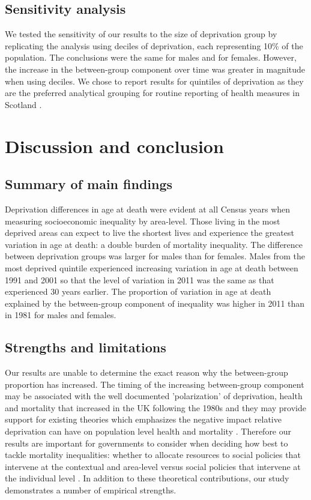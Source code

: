 \documentclass[12pt,oneside,a4paper]{article} %
\theoremstyle{definition}
\begin{document}
\FloatBarrier
\subsection{Sensitivity analysis}
We tested the sensitivity of our results to the size of deprivation group by
replicating the analysis using deciles of deprivation, each representing 10\% of
the population. The conclusions were the same for males and for females.
However, the increase in the between-group component over time was greater in
magnitude when using deciles. We chose to report results for quintiles of
deprivation as they are the preferred analytical grouping for routine reporting
of health measures in Scotland \citep{Health2017}.

\section{Discussion and conclusion}

\subsection{Summary of main findings}
Deprivation differences in age at death were evident at all Census years when measuring socioeconomic inequality by area-level. Those living in the most deprived areas can expect to live the shortest lives and experience the greatest variation in age at death: a double burden of mortality inequality. The difference between deprivation groups was larger for males than for females. Males from the most deprived quintile experienced increasing variation in age at death between 1991 and 2001 so that the level of variation in 2011 was the same as that experienced 30 years earlier. The proportion of variation in age at death explained by the between-group component of inequality was higher in 2011 than in 1981 for males and females.

\subsection{Strengths and limitations}
Our results are unable to determine the exact reason why the between-group proportion has increased. The timing of the increasing between-group component may be associated with the well documented 'polarization' of deprivation, health and mortality that increased in the UK following the 1980s \citep{Shaw2000,Mitchell2000} and they may provide support for existing theories which emphasizes the negative impact relative deprivation can have on population level health and mortality \citep{Wilkinson2007,Marmot2001}. Therefore our results are important for governments to consider when deciding how best to tackle mortality inequalities: whether to allocate resources to social policies that intervene at the contextual and area-level versus social policies that intervene at the individual level  \citep{Allik2016,Roux2001,Robert1999,TheScottishGovernment2016}. In addition to these theoretical contributions, our study demonstrates a number of empirical strengths.   
\end{document}
